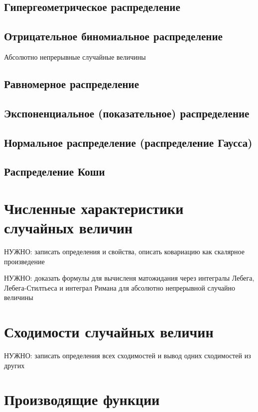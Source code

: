 \documentclass[12pt]{article}
\numberwithin{theorem}{section}
\numberwithin{proposition}{section}
\theoremstyle{definition}
\newcommand{\TODO}[1]{\textcolor{todocolor}{НУЖНО: #1}}
\begin{document}
	\subsection{Гипергеометрическое распределение}
	
	\subsection{Отрицательное биномиальное распределение}
	
	Абсолютно непрерывные случайные величины
	
	\subsection{Равномерное распределение}
	
	\subsection{Экспоненциальное (показательное) распределение}
	
	\subsection{Нормальное распределение (распределение Гаусса)}
	
	\subsection{Распределение Коши}
	
	\section{Численные характеристики случайных величин}
	
	\TODO{записать определения и свойства, описать ковариацию как скалярное произведение}
	
	\TODO{доказать формулы для вычисленя матожидания через интегралы Лебега, Лебега-Стилтьеса и интеграл Римана для абсолютно непрерывной случайно величины}
	
	
	
	\section{Сходимости случайных величин}
	
	\TODO{записать определения всех сходимостей и вывод одних сходимостей из других}
	
	\section{Производящие функции}
	
\end{document}
